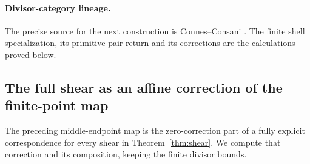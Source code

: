\documentclass[11pt]{article}
\theoremstyle{definition}\newtheorem{definition}[theorem]{Definition}
\theoremstyle{remark}\newtheorem{remark}[theorem]{Remark}
\begin{document}
\paragraph{Divisor-category lineage.}
The precise source for the next construction is
Connes--Consani \cite[Section 7.4, Lemma 7.7 and Proposition 7.8]{CCPericyclic}.
The finite shell specialization, its primitive-pair return and its corrections
are the calculations proved below.


\subsection{The full shear as an affine correction of the finite-point map}

The preceding middle-endpoint map is the zero-correction part
of a fully explicit correspondence for every shear in
Theorem~\ref{thm:shear}.  We compute that correction and its
composition, keeping the finite divisor bounds.
\end{document}
